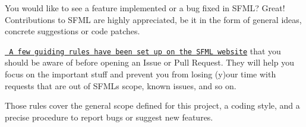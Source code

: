 You would like to see a feature implemented or a bug fixed in SFML? Great! Contributions to SFML are highly appreciated, be it in the form of general ideas, concrete suggestions or code patches.

\href{https://www.sfml-dev.org/contribute.php}{\texttt{ A few guiding rules have been set up on the SFML website}} that you should be aware of before opening an Issue or Pull Request. They will help you focus on the important stuff and prevent you from losing (y)our time with requests that are out of SFML\textquotesingle{}s scope, known issues, and so on.

Those rules cover the general scope defined for this project, a coding style, and a precise procedure to report bugs or suggest new features. 